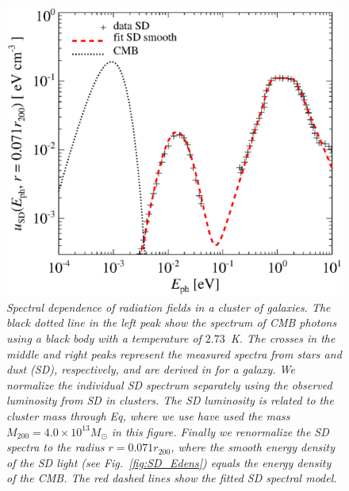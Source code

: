 \documentclass[10pt,aps,pra,reprint,amsmath,amsfonts,amssymb,showpacs]{revtex4-1}
\newcommand{\msun}{M_\odot}
\newcommand{\rvir}{r_{200}}
\newcommand{\mvir}{M_{200}}
\begin{document}
\begin{figure}%
 \includegraphics[width=0.99\columnwidth]{figures/fit.porter.v2.eps}
\caption{\it Spectral dependence of radiation fields in a cluster of
  galaxies. The black dotted line in the left peak show the spectrum
  of CMB photons using a black body with a temperature of
  $2.73$~K. The crosses in the middle and right peaks represent the
  measured spectra from stars and dust (SD), respectively, and are
  derived in \cite{2006ApJ...648L..29P} for a galaxy. We normalize the
  individual SD spectrum separately using the observed luminosity from
  SD in clusters. The SD luminosity is related to the cluster mass
  through Eq, where we use have used the mass
  $\mvir=4.0\times10^{13}\msun$ in this figure. Finally we renormalize
  the SD spectra to the radius $r=0.071\rvir$, where the smooth energy
  density of the SD light (see Fig.~\ref{fig:SD_Edens}) equals the
  energy density of the CMB. The red dashed lines show the fitted SD
  spectral model.}
 \label{fig:SD_spectra}
\end{figure}
\end{document}
